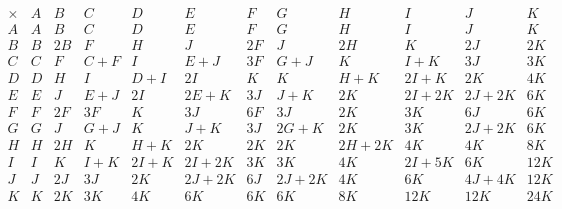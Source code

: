 \documentclass[11pt,oneside]{article}
\newcommand{\thinplus}{\!+\!}
\begin{document}
$$
\begin{array}{r|rrrrrrrrrrr}
\times & A & B & C & D & E & F & G & H & I & J & K \\
\hline
A & A & B & C & D & E & F & G & H & I & J & K \\
B & B & 2B & F & H & J & 2F & J & 2H & K & 2J & 2K \\
C & C & F & C\thinplus F & I & E\thinplus J & 3F & G\thinplus J & K & I\thinplus K & 3J & 3K \\
D & D & H & I & D\thinplus I & 2I & K & K & H\thinplus K & 2I\thinplus K & 2K & 4K \\
E & E & J & E\thinplus J & 2I & 2E\thinplus K & 3J & J\thinplus K & 2K & 2I\thinplus 2K & 2J\thinplus 2K & 6K \\
F & F & 2F & 3F & K & 3J & 6F & 3J & 2K & 3K & 6J & 6K \\
G & G & J & G\thinplus J & K & J\thinplus K & 3J & 2G\thinplus K & 2K & 3K & 2J\thinplus 2K & 6K \\
H & H & 2H & K & H\thinplus K & 2K & 2K & 2K & 2H\thinplus 2K & 4K & 4K & 8K \\
I & I & K & I\thinplus K & 2I\thinplus K & 2I\thinplus 2K & 3K & 3K & 4K & 2I\thinplus 5K & 6K & 12K \\
J & J & 2J & 3J & 2K & 2J\thinplus 2K & 6J & 2J\thinplus 2K & 4K & 6K & 4J\thinplus 4K & 12K \\
K & K & 2K & 3K & 4K & 6K & 6K & 6K & 8K & 12K & 12K & 24K \\
\end{array}
$$
\end{document}
